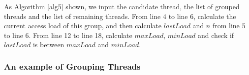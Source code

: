 \documentclass[a4paper,fleqn]{cas-sc}
\begin{document}
As Algorithm  \ref{alg5} shown, we input the candidate thread, the list of grouped threads and the list of remaining threads. From line 4 to line 6, calculate the current access load of this group, and then calculate $lastLoad$ and $n$ from line 5 to line 6. From line 12 to line 18, calculate $maxLoad$, $minLoad$ and check if $lastLoad$ is between $maxLoad$ and $minLoad$.

\subsubsection{An example of Grouping Threads}

\begin{figure}[htbp] 
	\centering	
\end{figure}
\end{document}

